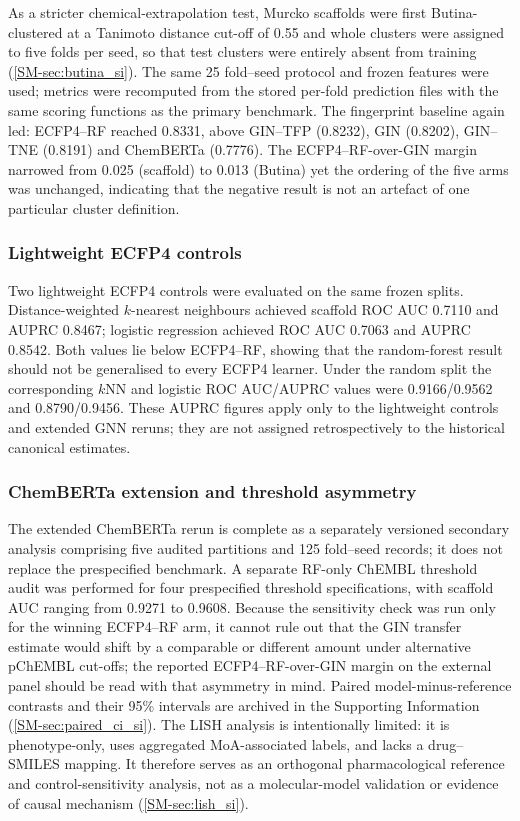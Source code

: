 \documentclass[11pt,a4paper]{article}
\begin{document}
As a stricter chemical-extrapolation test, Murcko scaffolds were first Butina-clustered at a Tanimoto distance cut-off of \num{0.55} and whole clusters were assigned to five folds per seed, so that test clusters were entirely absent from training (\cref{SM-sec:butina_si}). The same \num{25} fold--seed protocol and frozen features were used; metrics were recomputed from the stored per-fold prediction files with the same scoring functions as the primary benchmark. The fingerprint baseline again led: ECFP4--RF reached \num{0.8331}, above GIN--TFP (\num{0.8232}), GIN (\num{0.8202}), GIN--TNE (\num{0.8191}) and ChemBERTa (\num{0.7776}). The ECFP4--RF-over-GIN margin narrowed from \num{0.025} (scaffold) to \num{0.013} (Butina) yet the ordering of the five arms was unchanged, indicating that the negative result is not an artefact of one particular cluster definition.

\subsubsection{Lightweight ECFP4 controls}

Two lightweight ECFP4 controls were evaluated on the same frozen splits. Distance-weighted $k$-nearest neighbours achieved scaffold ROC AUC \num{0.7110} and AUPRC \num{0.8467}; logistic regression achieved ROC AUC \num{0.7063} and AUPRC \num{0.8542}. Both values lie below ECFP4--RF, showing that the random-forest result should not be generalised to every ECFP4 learner. Under the random split the corresponding $k$NN and logistic ROC AUC/AUPRC values were \num{0.9166}/\num{0.9562} and \num{0.8790}/\num{0.9456}. These AUPRC figures apply only to the lightweight controls and extended GNN reruns; they are not assigned retrospectively to the historical canonical estimates.

\subsubsection{ChemBERTa extension and threshold asymmetry}

The extended ChemBERTa rerun is complete as a separately versioned secondary analysis comprising five audited partitions and \num{125} fold--seed records; it does not replace the prespecified benchmark. A separate RF-only ChEMBL threshold audit was performed for four prespecified threshold specifications, with scaffold AUC ranging from \num{0.9271} to \num{0.9608}. Because the sensitivity check was run only for the winning ECFP4--RF arm, it cannot rule out that the GIN transfer estimate would shift by a comparable or different amount under alternative pChEMBL cut-offs; the reported ECFP4--RF-over-GIN margin on the external panel should be read with that asymmetry in mind. Paired model-minus-reference contrasts and their 95\% intervals are archived in the Supporting Information (\cref{SM-sec:paired_ci_si}). The LISH analysis is intentionally limited: it is phenotype-only, uses aggregated MoA-associated labels, and lacks a drug--SMILES mapping. It therefore serves as an orthogonal pharmacological reference and control-sensitivity analysis, not as a molecular-model validation or evidence of causal mechanism (\cref{SM-sec:lish_si}).
\end{document}
